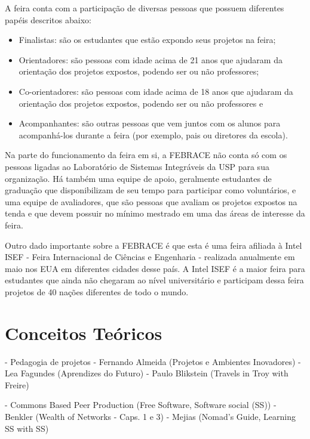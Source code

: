  A feira conta com a participação de diversas pessoas que possuem diferentes papéis descritos abaixo:

  \begin{itemize}
    \item{
      Finalistas: são os estudantes que estão expondo seus projetos na feira;
    }
    \item{
		Orientadores: são pessoas com idade acima de 21 anos que ajudaram da orientação dos projetos expostos, podendo ser ou não professores;
    }
    \item{
		Co-orientadores: são pessoas com idade acima de 18 anos que ajudaram da orientação dos projetos expostos, podendo ser ou não professores e
    }
    \item{
		Acompanhantes: são outras pessoas que vem juntos com os alunos para acompanhá-los durante a feira (por exemplo, pais ou diretores da escola).
    }
  \end{itemize}

 Na parte do funcionamento da feira em si, a FEBRACE não conta só com os pessoas ligadas ao Laboratório de Sistemas Integráveis da USP para sua organização. Há também uma equipe de apoio, geralmente estudantes de graduação que disponibilizam de seu tempo para participar como voluntários, e uma equipe de avaliadores, que são pessoas que avaliam os projetos expostos na tenda e que devem possuir no mínimo mestrado em uma das áreas de interesse da feira.

 Outro dado importante sobre a FEBRACE é que esta é uma feira afiliada à Intel ISEF - Feira Internacional de Ciências e Engenharia - realizada anualmente em maio nos EUA em diferentes cidades desse país. A Intel ISEF é a maior feira para estudantes que ainda não chegaram ao nível universitário e participam dessa feira projetos de 40 nações diferentes de todo o mundo.

  \section{Conceitos Teóricos}

  - Pedagogia de projetos
    - Fernando Almeida (Projetos e Ambientes Inovadores)
    - Lea Fagundes (Aprendizes do Futuro)
    - Paulo Blikstein (Travels in Troy with Freire)

  - Commons Based Peer Production (Free Software, Software social (SS))
    - Benkler (Wealth of Networks - Caps. 1 e 3)
    - Mejias (Nomad's Guide, Learning SS with SS)
